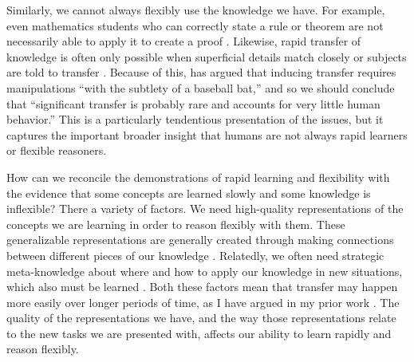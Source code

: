 \documentclass[11pt]{article}
\begin{document}
Similarly, we cannot always flexibly use the knowledge we have. For example, even mathematics students who can correctly state a rule or theorem are not necessarily able to apply it to create a proof \citep{Weber2001}. Likewise, rapid transfer of knowledge is often only possible when superficial details match closely or subjects are told to transfer \citep[e.g.]{Gick1980}. Because of this, \citet{Detterman1993} has argued that inducing transfer requires manipulations ``with the subtlety of a baseball bat,'' and so we should conclude that ``significant transfer is probably rare and accounts for very little human behavior.'' This is a particularly tendentious presentation of the issues, but it captures the important broader insight that humans are not always rapid learners or flexible reasoners. \par 
How can we reconcile the demonstrations of rapid learning and flexibility with the evidence that some concepts are learned slowly and some knowledge is inflexible? There a variety of factors. We need high-quality representations of the concepts we are learning in order to reason flexibly with them. These generalizable representations are generally created through making connections between different pieces of our knowledge \citep{Wilensky1991, Schwartz2015}. Relatedly, we often need strategic meta-knowledge about where and how to apply our knowledge in new situations, which also must be learned \citep{Weber2001}. Both these factors mean that transfer may happen more easily over longer periods of time, as I have argued in my prior work \citep{Lampinen2017a}. The quality of the representations we have, and the way those representations relate to the new tasks we are presented with, affects our ability to learn rapidly and reason flexibly. \par 
\end{document}
